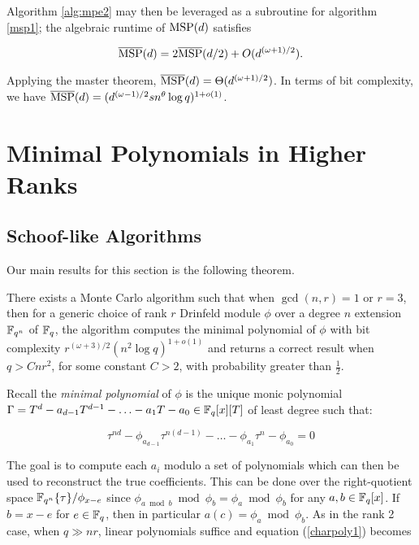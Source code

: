 Algorithm \ref{alg:mpe2} may then be leveraged as a subroutine for algorithm \ref{msp1}; the algebraic runtime of $\textnormal{MSP}(d)$ satisfies

\begin{equation*}
    \overline{\textnormal{MSP}}(d) = 2\overline{\textnormal{MSP}}(d/2) + O(d^{(\omega + 1)/2}).
\end{equation*}

Applying the master theorem, $\overline{\textnormal{MSP}}(d) = \Theta(d^{(\omega + 1)/2})$. In terms of bit complexity, we have $ \overline{\textnormal{MSP}}(d) = (d^{(\omega-1)/2}sn^{\theta} \log q)^{1 + o(1)}$.



\section{Minimal Polynomials in Higher Ranks}


\subsection{Schoof-like Algorithms}

Our main results for this section is the following theorem.

\begin{theorem}\label{schooflike}
There exists a Monte Carlo algorithm such that when $\gcd(n,r) = 1$ or $r = 3$, then for a generic choice of rank $r$ Drinfeld module $\phi$ over a degree $n$ extension $\mathbb{F}_{q^n}$ of  $\mathbb{F}_q$, the algorithm computes the minimal polynomial of $\phi$ with bit complexity $r^{(\omega+3)/2}(n^2 \log q)^{1 + o(1)}$ and returns a correct result when $q > Cnr^2$, for some constant $C > 2$, with probability greater than $\frac{1}{2}$.
\end{theorem}

Recall the \textit{minimal polynomial} of $\phi$ is the unique monic polynomial $\Gamma = T^{d} - a_{d-1}T^{d-1} - \ldots - a_1T - a_0 \in \mathbb{F}_q[x][T]$ of least degree such that:

\begin{equation} \label{charpoly1}
 \tau^{nd} - \phi_{a_{d-1}}\tau^{n(d-1)} - \ldots - \phi_{a_1} \tau^n - \phi_{a_0} = 0
\end{equation}


The goal is to compute each $a_i$ modulo a set of polynomials which can then be used to reconstruct the true coefficients. This can be done over the right-quotient space $\mathbb{F}_{q^n}\{\tau \}/\phi_{x-e}$ since $\phi_{a \bmod b} \bmod \phi_b = \phi_a \bmod \phi_b$ for any $a, b \in \mathbb{F}_q[x]$. If $b = x - e$ for $e \in \mathbb{F}_q$, then in particular $a(c) = \phi_a \bmod \phi_b$. As in the rank 2 case, when $q \gg nr$, linear polynomials suffice and equation (\ref{charpoly1}) becomes

